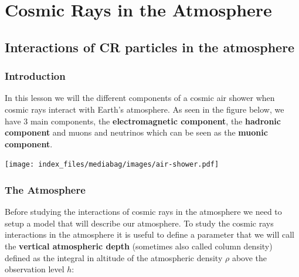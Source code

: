 \documentclass[
  letterpaper,
  DIV=11,
  numbers=noendperiod]{scrreprt}
\newlength{\cslhangindent}
\newenvironment{CSLReferences}[2] %
 {\begin{list}{}{%
  \setlength{\itemindent}{0pt}
  \setlength{\leftmargin}{0pt}
  \setlength{\parsep}{0pt}
  \ifodd #1
   \setlength{\leftmargin}{\cslhangindent}
   \setlength{\itemindent}{-1\cslhangindent}
  \fi
  \setlength{\itemsep}{#2\baselineskip}}}
 {\end{list}}
\begin{document}
\label{refs}
\begin{CSLReferences}{0}{1}
\end{CSLReferences}


\chapter*{Cosmic Rays in the
Atmosphere}\label{cosmic-rays-in-the-atmosphere}


\section*{Interactions of CR particles in the
atmosphere}\label{interactions-of-cr-particles-in-the-atmosphere}


\subsection*{Introduction}\label{introduction-1}

In this lesson we will the different components of a cosmic air shower
when cosmic rays interact with Earth's atmosphere. As seen in the figure
below, we have 3 main components, the \textbf{electromagnetic
component}, the \textbf{hadronic component} and muons and neutrinos
which can be seen as the \textbf{muonic component}.

\texttt{[image: index\_files/mediabag/images/air-shower.pdf]}

\subsection*{The Atmosphere}\label{the-atmosphere}

Before studying the interactions of cosmic rays in the atmosphere we
need to setup a model that will describe our atmosphere. To study the
cosmic rays interactions in the atmosphere it is useful to define a
parameter that we will call the \textbf{vertical atmospheric depth}
(sometimes also called column density) defined as the integral in
altitude of the atmospheric density \(\rho\) above the observation level
\(h\):
\end{document}
